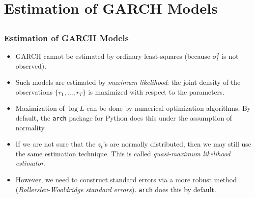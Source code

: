 \section[Estimation]{Estimation of GARCH Models}\subsection*{}
\begin{frame}%

\frametitle{Estimation of GARCH Models}

\begin{itemize}
\item GARCH cannot be estimated by ordinary least-squares (because
$\sigma^2_t$ is not observed).

\item Such models are estimated by \emph{\color{red}maximum likelihood}: the
joint density of the observations $\{r_{1},\ldots ,r_{T}\}$ is maximized
with respect to the parameters.

\item Maximization of $\log L$ can be done by numerical optimization
algorithms. By default, the \texttt{arch} package for Python does this under the assumption of normality.

\item If we are not sure that the $z_{t}$'s are normally distributed, then
we may still use the same estimation technique. This is called \emph{%
\color{red}quasi-maximum likelihood estimator}.

\item However, we need to construct standard errors via a more robust method
(\emph{\color{red}Bollerslev-Wooldridge standard errors}). \texttt{arch} does this by default.
\end{itemize}

\end{frame}%

